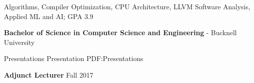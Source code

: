 \documentclass[MMMMyyyy,nonstopmode]{simpleresumecv_stacked}
\newif\ifLOCATION
\begin{document}
\begin{Body}
\BulletItem
Algorithms, Compiler Optimization, CPU Architecture, LLVM Software Analysis, Applied ML and AI; GPA 3.9

\iftrue %
\Gap

\Entry
\textbf{Bachelor of Science in Computer Science and Engineering} - 
Bucknell University
\ifLOCATION
\hfill Lewisburg, Pennsylvania
\fi

\iffalse
\hfill
\DatestampYM{1988}{09} --
\DatestampYM{1992}{06}
\fi
\iffalse %
\begin{Detail}
\BulletItem
Senior design project creating reference implementation of DHCP protocol for RFCs 1531 and 1534
\BulletItem
Concentrations in Digital Electronics and Geology

\end{Detail}
\fi %
\fi %

\iffalse %
\Section
{Certifications}
{Certifications}
{PDF:Certifications}

\Entry
\href{https://www.appdynamics.com/certifications/}
{\textbf{AppDynamics Certified Implementations Professional}}
\hfill
\DatestampYM{2016}{11}
\iffalse
\begin{Detail}
\begin{quote}
``An individual who attains the AppDynamics Certified Implementation Professional certification has demonstrated that he or she possesses the minimum acceptable level of knowledge and skills required to deploy AppDynamics Controllers, Agents, EUM Servers and Analytics Servers. 
This individual also has experience using AppDynamics APIs to extend and customize the AppDynamics platform.''
\end{quote}
\end{Detail}
\fi
\fi %



\newif\ifA
\newif\ifB
\newif\ifC
\Afalse
\Bfalse
\Cfalse
\ifA

\Section
{Presentations}%
{Presentation}%
{PDF:Presentations}%

\iffalse      %
\Entry
\textbf{Adjunct Lecturer}
\hfill
Fall 2017


\end{Body}
\end{document}
